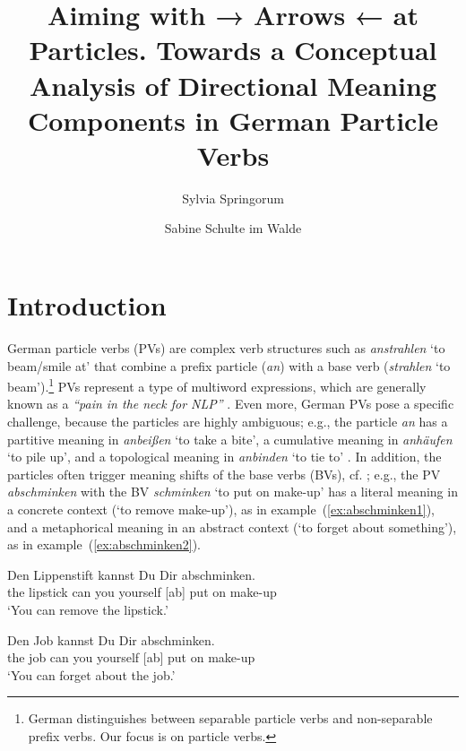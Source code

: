 \documentclass[output=paper]{langsci/langscibook}
\title{Aiming with → Arrows ← at
  Particles. Towards a Conceptual Analysis of Directional Meaning
  Components in German Particle Verbs}
\author{%
  Sylvia Springorum\affiliation{Institut für Maschinelle Sprachverarbeitung, Universität Stuttgart}\and 
  Sabine Schulte im Walde\affiliation{Institut für Maschinelle Sprachverarbeitung, Universität Stuttgart}
}
\begin{document}
\maketitle


\clearpage
\section{Introduction}

German particle verbs (PVs) are complex verb structures such as
\textit{anstrahlen} `to beam/smile at' that combine a prefix particle
(\textit{an}) with a base verb (\textit{strahlen} `to
beam').\footnote{German distinguishes between separable particle verbs
  and non-separable prefix verbs. Our focus is on particle verbs.} PVs
represent a type of multiword expressions, which are generally known
as a \textit{``pain in the neck for NLP''} \citep{SagEtAl:02}. Even
more, German PVs pose a specific challenge, because the particles are
highly ambiguous; e.g., the particle \textit{an} has a partitive
meaning in \textit{anbeißen} `to take a bite', a cumulative meaning in
\textit{anhäufen} `to pile up', and a topological meaning in
\textit{anbinden} `to tie to' \citep{Springorum:11}. In addition, the
particles often trigger meaning shifts of the base verbs (BVs),
cf. \citet{SpringorumEtAl:13,FrassinelliEtAl:17,Koeper/SchulteImWalde:18,SchulteImWaldeEtAl:18};
e.g., the PV \textit{abschminken} with the BV \textit{schminken} `to
put on make-up' has a literal meaning in a concrete context (`to
remove make-up'), as in example~(\ref{ex:abschminken1}), and a
metaphorical meaning in an abstract context (`to forget about
something'), as in example~(\ref{ex:abschminken2}).

\ea\label{ex:abschminken1}
\gll Den Lippenstift kannst Du Dir abschminken.\\
the lipstick can you yourself {[ab] put on make-up}\\
\glt `You can remove the lipstick.'
\z

\ea\label{ex:abschminken2}
\gll Den Job kannst Du Dir abschminken.\\
the job can you yourself {[ab] put on make-up}\\
\glt `You can forget about the job.'
\z

%
\end{document}
